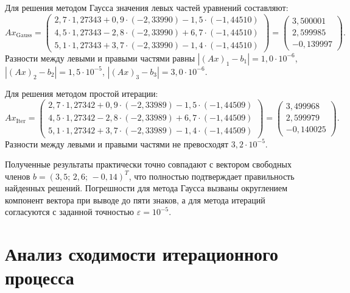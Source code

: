 Для решения методом Гаусса значения левых частей уравнений составляют:
\begin{equation}
    A x_{\text{Gauss}} = \begin{pmatrix}
        2{,}7 \cdot 1{,}27343 + 0{,}9 \cdot (-2{,}33990) - 1{,}5 \cdot (-1{,}44510) \\
        4{,}5 \cdot 1{,}27343 - 2{,}8 \cdot (-2{,}33990) + 6{,}7 \cdot (-1{,}44510) \\
        5{,}1 \cdot 1{,}27343 + 3{,}7 \cdot (-2{,}33990) - 1{,}4 \cdot (-1{,}44510)
    \end{pmatrix} = \begin{pmatrix}
        3{,}500001 \\
        2{,}599985 \\
        -0{,}139997
    \end{pmatrix}.
\end{equation}
Разности между левыми и правыми частями равны $|(Ax)_1 - b_1| = 1{,}0 \cdot 10^{-6}$, $|(Ax)_2 - b_2| = 1{,}5 \cdot 10^{-5}$, $|(Ax)_3 - b_3| = 3{,}0 \cdot 10^{-6}$.

Для решения методом простой итерации:
\begin{equation}
    A x_{\text{Iter}} = \begin{pmatrix}
        2{,}7 \cdot 1{,}27342 + 0{,}9 \cdot (-2{,}33989) - 1{,}5 \cdot (-1{,}44509) \\
        4{,}5 \cdot 1{,}27342 - 2{,}8 \cdot (-2{,}33989) + 6{,}7 \cdot (-1{,}44509) \\
        5{,}1 \cdot 1{,}27342 + 3{,}7 \cdot (-2{,}33989) - 1{,}4 \cdot (-1{,}44509)
    \end{pmatrix} = \begin{pmatrix}
        3{,}499968 \\
        2{,}599979 \\
        -0{,}140025
    \end{pmatrix}.
\end{equation}
Разности между левыми и правыми частями не превосходят $3{,}2 \cdot 10^{-5}$.

Полученные результаты практически точно совпадают с вектором свободных членов $b = (3{,}5;\, 2{,}6;\, -0{,}14)^T$, что полностью подтверждает правильность найденных решений. Погрешности для метода Гаусса вызваны округлением компонент вектора при выводе до пяти знаков, а для метода итераций согласуются с заданной точностью $\varepsilon = 10^{-5}$.

\section{Анализ сходимости итерационного процесса}

